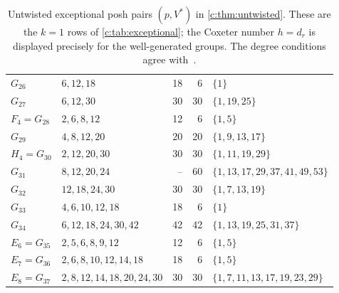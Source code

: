 \documentclass[11pt]{amsart}
\theoremstyle{definition}
\begin{document}
\begin{table}[htbp]
\begin{tabular}{@{}lL{.31\textwidth}rrL{.25\textwidth}@{}}
$G_{26}$ & $6,\allowbreak 12,\allowbreak 18$ & 18 & 6 & $\{1\}$ \\
$G_{27}$ & $6,\allowbreak 12,\allowbreak 30$ & 30 & 30 & $\{1,\allowbreak 19,\allowbreak 25\}$ \\
$F_4=G_{28}$ & $2,\allowbreak 6,\allowbreak 8,\allowbreak 12$ & 12 & 6 & $\{1,\allowbreak 5\}$ \\
$G_{29}$ & $4,\allowbreak 8,\allowbreak 12,\allowbreak 20$ & 20 & 20 & $\{1,\allowbreak 9,\allowbreak 13,\allowbreak 17\}$ \\
$H_4=G_{30}$ & $2,\allowbreak 12,\allowbreak 20,\allowbreak 30$ & 30 & 30 & $\{1,\allowbreak 11,\allowbreak 19,\allowbreak 29\}$ \\
$G_{31}$ & $8,\allowbreak 12,\allowbreak 20,\allowbreak 24$ & -- & 60 & $\{1,\allowbreak 13,\allowbreak 17,\allowbreak 29,\allowbreak 37,\allowbreak 41,\allowbreak 49,\allowbreak 53\}$ \\
$G_{32}$ & $12,\allowbreak 18,\allowbreak 24,\allowbreak 30$ & 30 & 30 & $\{1,\allowbreak 7,\allowbreak 13,\allowbreak 19\}$ \\
$G_{33}$ & $4,\allowbreak 6,\allowbreak 10,\allowbreak 12,\allowbreak 18$ & 18 & 6 & $\{1\}$ \\
$G_{34}$ & $6,\allowbreak 12,\allowbreak 18,\allowbreak 24,\allowbreak 30,\allowbreak 42$ & 42 & 42 & $\{1,\allowbreak 13,\allowbreak 19,\allowbreak 25,\allowbreak 31,\allowbreak 37\}$ \\
$E_6=G_{35}$ & $2,\allowbreak 5,\allowbreak 6,\allowbreak 8,\allowbreak 9,\allowbreak 12$ & 12 & 6 & $\{1,\allowbreak 5\}$ \\
$E_7=G_{36}$ & $2,\allowbreak 6,\allowbreak 8,\allowbreak 10,\allowbreak 12,\allowbreak 14,\allowbreak 18$ & 18 & 6 & $\{1,\allowbreak 5\}$ \\
$E_8=G_{37}$ & $2,\allowbreak 8,\allowbreak 12,\allowbreak 14,\allowbreak 18,\allowbreak 20,\allowbreak 24,\allowbreak 30$ & 30 & 30 & $\{1,\allowbreak 7,\allowbreak 11,\allowbreak 13,\allowbreak 17,\allowbreak 19,\allowbreak 23,\allowbreak 29\}$ \\
\bottomrule
\end{tabular}
\caption{Untwisted exceptional posh pairs $(p,V^*)$ in \cref{c:thm:untwisted}. These are the $k=1$ rows of \cref{c:tab:exceptional}; the Coxeter number $h=d_r$ is displayed precisely for the well-generated groups. The degree conditions agree with~\cite[Table 1]{IO}.}\label{tab:exceptional-untwisted}
\end{table}
\endgroup
\end{document}
